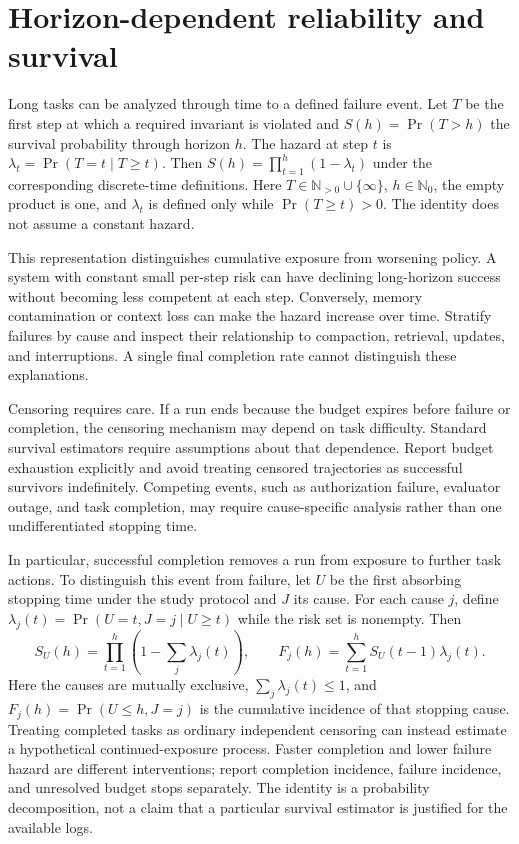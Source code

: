 \section{Horizon-dependent reliability and survival}\label{sec:C27:survival}
Long tasks can be analyzed through time to a defined failure event. Let $T$ be the first step at which a required invariant is violated and $S(h)=\Pr(T>h)$ the survival probability through horizon $h$. The hazard at step $t$ is $\lambda_t=\Pr(T=t\mid T\geq t)$. Then $S(h)=\prod_{t=1}^{h}(1-\lambda_t)$ under the corresponding discrete-time definitions. Here $T\in\mathbb N_{>0}\cup\{\infty\}$, $h\in\mathbb N_0$, the empty product is one, and $\lambda_t$ is defined only while $\Pr(T\geq t)>0$. The identity does not assume a constant hazard.

This representation distinguishes cumulative exposure from worsening policy. A system with constant small per-step risk can have declining long-horizon success without becoming less competent at each step. Conversely, memory contamination or context loss can make the hazard increase over time. Stratify failures by cause and inspect their relationship to compaction, retrieval, updates, and interruptions. A single final completion rate cannot distinguish these explanations.

Censoring requires care. If a run ends because the budget expires before failure or completion, the censoring mechanism may depend on task difficulty. Standard survival estimators require assumptions about that dependence. Report budget exhaustion explicitly and avoid treating censored trajectories as successful survivors indefinitely. Competing events, such as authorization failure, evaluator outage, and task completion, may require cause-specific analysis rather than one undifferentiated stopping time.

In particular, successful completion removes a run from exposure to further task actions. To distinguish this event from failure, let $U$ be the first absorbing stopping time under the study protocol and $J$ its cause. For each cause $j$, define $\lambda_j(t)=\Pr(U=t,J=j\mid U\geq t)$ while the risk set is nonempty. Then
\begin{equation}
 S_U(h)=\prod_{t=1}^{h}\left(1-\sum_j\lambda_j(t)\right),\qquad
 F_j(h)=\sum_{t=1}^{h}S_U(t-1)\lambda_j(t).
\end{equation}
Here the causes are mutually exclusive, $\sum_j\lambda_j(t)\leq1$, and $F_j(h)=\Pr(U\leq h,J=j)$ is the cumulative incidence of that stopping cause. Treating completed tasks as ordinary independent censoring can instead estimate a hypothetical continued-exposure process. Faster completion and lower failure hazard are different interventions; report completion incidence, failure incidence, and unresolved budget stops separately. The identity is a probability decomposition, not a claim that a particular survival estimator is justified for the available logs.

